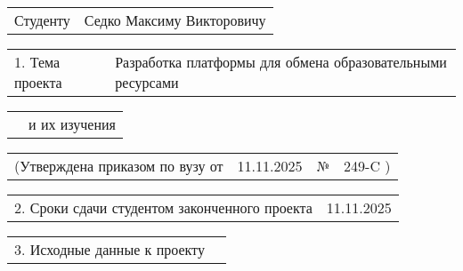 \documentclass[12pt, А4, twoside]{article}
\begin{document}
\begin{FlushLeft}
\fontsize{12}{0}

    \begin{tabular}{p{1.9cm} p{14.95cm}}
        \textsf{Студенту} &
        \textsf{Седко Максиму Викторовичу} \vspace{0pt} \hline
    \end{tabular}

    \vspace{-0.1 cm}

    \begin{tabular}{p{2.8cm} p{14.05cm}}
        \textsf{1. Тема проекта} &
        \textsf{Разработка платформы для обмена образовательными ресурсами} \vspace{0pt} \hline
    \end{tabular}

    \vspace{-0.1 cm}

    \begin{tabular}{p{2.8cm} p{14.05cm}}
        & \textsf{ и их изучения} \vspace{0pt} \hline
    \end{tabular}

    \vspace{-0.1 cm}

    \begin{tabular}{p{5.9cm} p{4.8cm} p{0.3cm} p{5.0cm}}
        \textsf{(Утверждена приказом по вузу от} &
        \centering \textsf{11.11.2025} \vspace{1pt} \hline &
        \centering \textsf{№} &
        \centering \textsf{249-C \hspace{0.5cm} )} \hline
    \end{tabular}

    \vspace{-0.1 cm}

    \begin{tabular}{p{9.4cm} p{7.45cm}}
        \textsf{2. Сроки сдачи студентом законченного проекта} &
        \centering \textsf{11.11.2025} \vspace{1pt} \hline
    \end{tabular}

    \vspace{-0.1 cm}

    \begin{tabular}{p{5.7cm} p{11.15cm}}
        \textsf{3. Исходные данные к проекту} &
        \vspace{1pt} \hline
    \end{tabular}


\end{FlushLeft}
\end{document}
